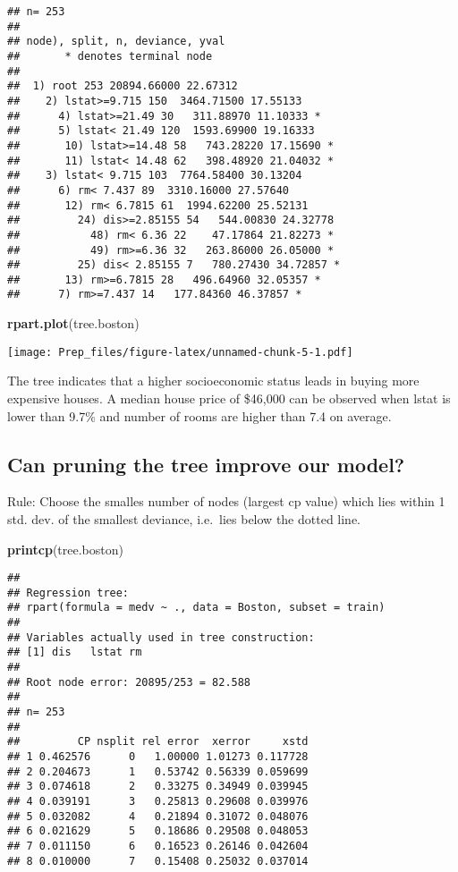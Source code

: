 \documentclass[]{article}
\newenvironment{Shaded}{\begin{snugshade}}{\end{snugshade}}
\newcommand{\KeywordTok}[1]{\textcolor[rgb]{0.13,0.29,0.53}{\textbf{#1}}}
\newcommand{\NormalTok}[1]{#1}
\begin{document}
\begin{verbatim}
## n= 253 
## 
## node), split, n, deviance, yval
##       * denotes terminal node
## 
##  1) root 253 20894.66000 22.67312  
##    2) lstat>=9.715 150  3464.71500 17.55133  
##      4) lstat>=21.49 30   311.88970 11.10333 *
##      5) lstat< 21.49 120  1593.69900 19.16333  
##       10) lstat>=14.48 58   743.28220 17.15690 *
##       11) lstat< 14.48 62   398.48920 21.04032 *
##    3) lstat< 9.715 103  7764.58400 30.13204  
##      6) rm< 7.437 89  3310.16000 27.57640  
##       12) rm< 6.7815 61  1994.62200 25.52131  
##         24) dis>=2.85155 54   544.00830 24.32778  
##           48) rm< 6.36 22    47.17864 21.82273 *
##           49) rm>=6.36 32   263.86000 26.05000 *
##         25) dis< 2.85155 7   780.27430 34.72857 *
##       13) rm>=6.7815 28   496.64960 32.05357 *
##      7) rm>=7.437 14   177.84360 46.37857 *
\end{verbatim}

\begin{Shaded}
\begin{Highlighting}[]
\KeywordTok{rpart.plot}\NormalTok{(tree.boston)}
\end{Highlighting}
\end{Shaded}

\texttt{[image: Prep\_files/figure-latex/unnamed-chunk-5-1.pdf]}

The tree indicates that a higher socioeconomic status leads in buying
more expensive houses. A median house price of \$46,000 can be observed
when lstat is lower than 9.7\% and number of rooms are higher than 7.4
on average.

\hypertarget{can-pruning-the-tree-improve-our-model}{%
\subsection{Can pruning the tree improve our
model?}\label{can-pruning-the-tree-improve-our-model}}

Rule: Choose the smalles number of nodes (largest cp value) which lies
within 1 std. dev. of the smallest deviance, i.e.~lies below the dotted
line.

\begin{Shaded}
\begin{Highlighting}[]
\KeywordTok{printcp}\NormalTok{(tree.boston)}
\end{Highlighting}
\end{Shaded}

\begin{verbatim}
## 
## Regression tree:
## rpart(formula = medv ~ ., data = Boston, subset = train)
## 
## Variables actually used in tree construction:
## [1] dis   lstat rm   
## 
## Root node error: 20895/253 = 82.588
## 
## n= 253 
## 
##         CP nsplit rel error  xerror     xstd
## 1 0.462576      0   1.00000 1.01273 0.117728
## 2 0.204673      1   0.53742 0.56339 0.059699
## 3 0.074618      2   0.33275 0.34949 0.039945
## 4 0.039191      3   0.25813 0.29608 0.039976
## 5 0.032082      4   0.21894 0.31072 0.048076
## 6 0.021629      5   0.18686 0.29508 0.048053
## 7 0.011150      6   0.16523 0.26146 0.042604
## 8 0.010000      7   0.15408 0.25032 0.037014
\end{verbatim}
\end{document}
